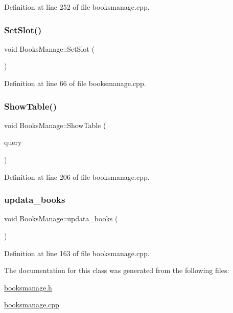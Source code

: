 Definition at line 252 of file booksmanage.\+cpp.

\mbox{\label{class_books_manage_a0ee0a3e432c7789497c17758d1f82fdf}} 
\subsubsection{\texorpdfstring{SetSlot()}{SetSlot()}}
{\footnotesize\ttfamily void Books\+Manage\+::\+Set\+Slot (\begin{DoxyParamCaption}{ }\end{DoxyParamCaption})}



Definition at line 66 of file booksmanage.\+cpp.

\mbox{\label{class_books_manage_abbacf5e112bdee769aaa4d22c0e14744}} 
\subsubsection{\texorpdfstring{ShowTable()}{ShowTable()}}
{\footnotesize\ttfamily void Books\+Manage\+::\+Show\+Table (\begin{DoxyParamCaption}\item[{Q\+Sql\+Query}]{query }\end{DoxyParamCaption})}



Definition at line 206 of file booksmanage.\+cpp.

\mbox{\label{class_books_manage_aba42cfe2129f1b92dab5a08e1f73ee07}} 
\subsubsection{\texorpdfstring{updata\_books}{updata\_books}}
{\footnotesize\ttfamily void Books\+Manage\+::updata\+\_\+books (\begin{DoxyParamCaption}{ }\end{DoxyParamCaption})\hspace{0.3cm}{\ttfamily [slot]}}



Definition at line 163 of file booksmanage.\+cpp.



The documentation for this class was generated from the following files\+:\begin{DoxyCompactItemize}
\item 
\mbox{\hyperlink{booksmanage_8h}{booksmanage.\+h}}\item 
\mbox{\hyperlink{booksmanage_8cpp}{booksmanage.\+cpp}}\end{DoxyCompactItemize}
